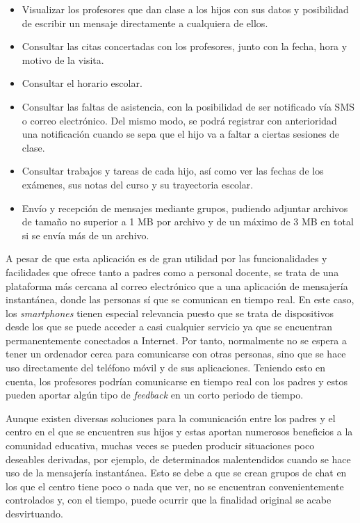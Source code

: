 \begin{itemize}
	\item Visualizar los profesores que dan clase a los hijos con sus datos y posibilidad de escribir un mensaje directamente a cualquiera de ellos.
	\item Consultar las citas concertadas con los profesores, junto con la fecha, hora y motivo de la visita.
	\item Consultar el horario escolar.
	\item Consultar las faltas de asistencia, con la posibilidad de ser notificado vía \acf{SMS} o correo electrónico. Del mismo modo, se podrá registrar con anterioridad una notificación cuando se sepa que el hijo va a faltar a ciertas sesiones de clase.
	\item Consultar trabajos y tareas de cada hijo, así como ver las fechas de los exámenes, sus notas del curso y su trayectoria escolar.
	\item Envío y recepción de mensajes mediante grupos, pudiendo adjuntar archivos de tamaño no superior a 1 \acf{MB} por archivo y de un máximo de 3 \acs{MB} en total si se envía más de un archivo.
\end{itemize}

A pesar de que esta aplicación es de gran utilidad por las funcionalidades y facilidades que ofrece tanto a padres como a personal docente, se trata de una plataforma más cercana al correo electrónico que a una aplicación de mensajería instantánea, donde las personas sí que se comunican en tiempo real. En este caso, los \textit{smartphones} tienen especial relevancia puesto que se trata de dispositivos desde los que se puede acceder a casi cualquier servicio ya que se encuentran permanentemente conectados a Internet. Por tanto, normalmente no se espera a tener un ordenador cerca para comunicarse con otras personas, sino que se hace uso directamente del teléfono móvil y de sus aplicaciones. Teniendo esto en cuenta, los profesores podrían comunicarse en tiempo real con los padres y estos pueden aportar algún tipo de \textit{feedback} en un corto periodo de tiempo.

Aunque existen diversas soluciones para la comunicación entre los padres y el centro en el que se encuentren sus hijos y estas aportan numerosos beneficios a la comunidad educativa, muchas veces se pueden producir situaciones poco deseables derivadas, por ejemplo, de determinados malentendidos cuando se hace uso de la mensajería instantánea. Esto se debe a que se crean grupos de chat en los que el centro tiene poco o nada que ver, no se encuentran convenientemente controlados y, con el tiempo, puede ocurrir que la finalidad original se acabe desvirtuando.

